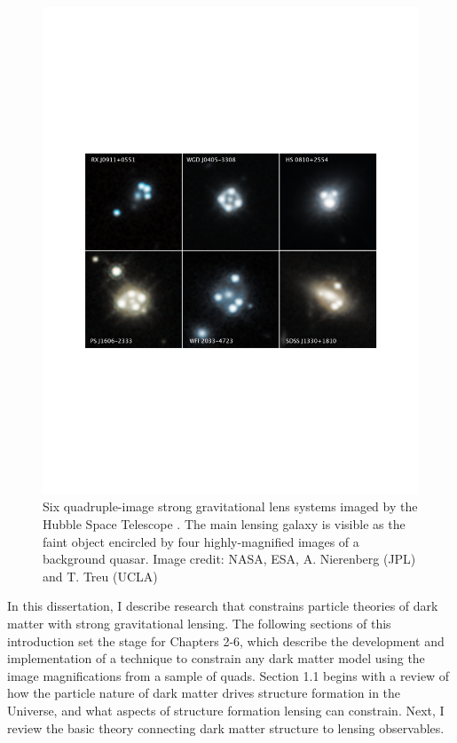 \begin{figure}
	\centering
	\includegraphics[clip,trim=2.5cm 8cm 2.5cm
	8.5cm,width=.95\textwidth,keepaspectratio]{./figures_introduction/lenses.pdf}
	\caption[Six images of strong gravitational lenses]{\label{fig:lens2033} Six quadruple-image strong gravitational lens systems imaged by the Hubble Space Telescope \cite{Nierenberg++19}. The main lensing galaxy is visible as the faint object encircled by four highly-magnified images of a background quasar. Image credit: NASA, ESA, A. Nierenberg (JPL) and T. Treu (UCLA)}
\end{figure}	
In this dissertation, I describe research that constrains particle theories of dark matter with strong gravitational lensing. The following sections of this introduction set the stage for Chapters 2-6, which describe the development and implementation of a technique to constrain any dark matter model using the image magnifications from a sample of quads. Section 1.1 begins with a review of how the particle nature of dark matter drives structure formation in the Universe, and what aspects of structure formation lensing can constrain. Next, I review the basic theory connecting dark matter structure to lensing observables. 

